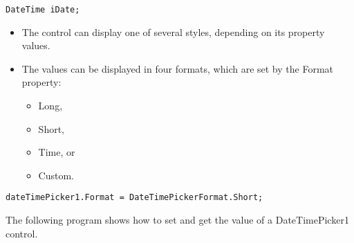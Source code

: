 \begin{lstlisting}[numbers=none]
	DateTime iDate;
\end{lstlisting}

\begin{itemize}
	\item The control can display one of several styles, depending on its property values. 
	\item The values can be displayed in four formats, which are set by the Format property: 
	\begin{multicols}{4}
		\begin{itemize}
			\item Long, 
			\item Short, 
			\item Time, or 
			\item Custom.
		\end{itemize}
	\end{multicols}	
\end{itemize}


\begin{lstlisting}[numbers=none]
	dateTimePicker1.Format = DateTimePickerFormat.Short;
\end{lstlisting}

The following {\cs} program shows how to set and get the value of a DateTimePicker1 control.



%
%
%

